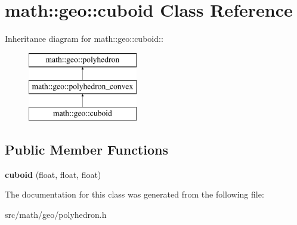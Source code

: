 \hypertarget{classmath_1_1geo_1_1cuboid}{
\section{math::geo::cuboid Class Reference}
\label{classmath_1_1geo_1_1cuboid}
}
Inheritance diagram for math::geo::cuboid::\begin{figure}[H]
\begin{center}
\leavevmode
\includegraphics[height=3cm]{classmath_1_1geo_1_1cuboid}
\end{center}
\end{figure}
\subsection*{Public Member Functions}
\begin{DoxyCompactItemize}
\item 
\hypertarget{classmath_1_1geo_1_1cuboid_a72bd7e6bf32ccd6928e375efa3036491}{
{\bfseries cuboid} (float, float, float)}
\label{classmath_1_1geo_1_1cuboid_a72bd7e6bf32ccd6928e375efa3036491}

\end{DoxyCompactItemize}


The documentation for this class was generated from the following file:\begin{DoxyCompactItemize}
\item 
src/math/geo/polyhedron.h\end{DoxyCompactItemize}
